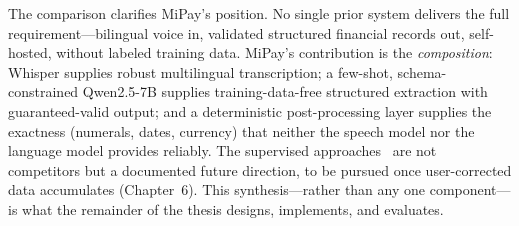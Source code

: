 The comparison clarifies MiPay's position. No single prior system delivers the
full requirement---bilingual voice in, validated structured financial records
out, self-hosted, without labeled training data. MiPay's contribution is the
\emph{composition}: Whisper supplies robust multilingual transcription; a
few-shot, schema-constrained Qwen2.5-7B supplies training-data-free structured
extraction with guaranteed-valid output; and a deterministic post-processing
layer supplies the exactness (numerals, dates, currency) that neither the speech
model nor the language model provides reliably. The supervised
approaches~\cite{lample2016ner,antoun2020arabert} are not competitors but a
documented future direction, to be pursued once user-corrected data accumulates
(Chapter~6). This synthesis---rather than any one component---is what the
remainder of the thesis designs, implements, and evaluates.